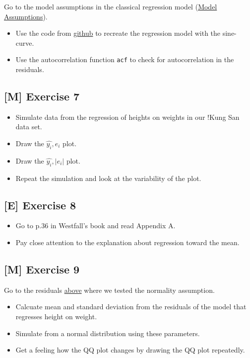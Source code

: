 \documentclass[
]{book}
\providecommand{\tightlist}{%
  \setlength{\itemsep}{0pt}\setlength{\parskip}{0pt}}
\begin{document}
Go to the model assumptions in the classical regression model (\hyperref[_model_assumptions]{Model Assumptions}).

\begin{itemize}
\item
  Use the code from \href{https://github.com/jdegenfellner/Script_QM2_ZHAW/blob/main/02-Simple_Linear_Regression.Rmd}{github}
  to recreate the regression model with the sine-curve.
\item
  Use the autocorrelation function \texttt{acf} to check for autocorrelation in the residuals.
\end{itemize}

\subsection{{[}M{]} Exercise 7}\label{exercise7_simpl_lin_reg}

\begin{itemize}
\tightlist
\item
  Simulate data from the regression of heights on weights in our !Kung San data set.
\item
  Draw the \(\hat{y_i}, e_i\) plot.
\item
  Draw the \(\hat{y_i}, |e_i|\) plot.
\item
  Repeat the simulation and look at the variability of the plot.
\end{itemize}

\subsection{{[}E{]} Exercise 8}\label{exercise8_simpl_lin_reg}

\begin{itemize}
\tightlist
\item
  Go to p.36 in Westfall's book and read Appendix A.
\item
  Pay close attention to the explanation about regression toward the mean.
\end{itemize}

\subsection{{[}M{]} Exercise 9}\label{exercise9_simpl_lin_reg}

Go to the residuals \hyperref[normality_assumption]{above} where we tested the normality assumption.

\begin{itemize}
\tightlist
\item
  Calcuate mean and standard deviation from the residuals of the model
  that regresses height on weight.
\item
  Simulate from a normal distribution using these parameters.
\item
  Get a feeling how the QQ plot changes by drawing the QQ plot repeatedly.
\end{itemize}
\end{document}
